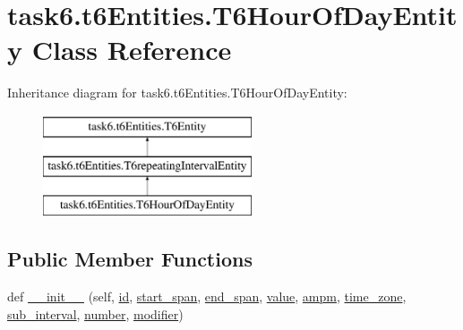 \hypertarget{classtask6_1_1t6Entities_1_1T6HourOfDayEntity}{}\section{task6.\+t6\+Entities.\+T6\+Hour\+Of\+Day\+Entity Class Reference}
\label{classtask6_1_1t6Entities_1_1T6HourOfDayEntity}
Inheritance diagram for task6.\+t6\+Entities.\+T6\+Hour\+Of\+Day\+Entity\+:\begin{figure}[H]
\begin{center}
\leavevmode
\includegraphics[height=3.000000cm]{classtask6_1_1t6Entities_1_1T6HourOfDayEntity}
\end{center}
\end{figure}
\subsection*{Public Member Functions}
\begin{DoxyCompactItemize}
\item 
def \hyperlink{classtask6_1_1t6Entities_1_1T6HourOfDayEntity_a0a375307b245c7408ae1bbaec1585dc1}{\+\_\+\+\_\+init\+\_\+\+\_\+} (self, \hyperlink{classtask6_1_1t6Entities_1_1T6Entity_afeeced8134bb3ebe0cfecc64d0ab46a4}{id}, \hyperlink{classtask6_1_1t6Entities_1_1T6Entity_a52779e9af8864dc98e8b02fc5b9b041a}{start\+\_\+span}, \hyperlink{classtask6_1_1t6Entities_1_1T6Entity_aeb402200b156cd9562c5111dfe777b98}{end\+\_\+span}, \hyperlink{classtask6_1_1t6Entities_1_1T6HourOfDayEntity_aca30067d70324692cc16ad71cc422dec}{value}, \hyperlink{classtask6_1_1t6Entities_1_1T6HourOfDayEntity_a79df4da1e3285cf9c75ca102c631bd71}{ampm}, \hyperlink{classtask6_1_1t6Entities_1_1T6HourOfDayEntity_ac288e691b6a5181108729f0f1d8c0e84}{time\+\_\+zone}, \hyperlink{classtask6_1_1t6Entities_1_1T6HourOfDayEntity_afe660c17ee2ca754246bf4b931361e4b}{sub\+\_\+interval}, \hyperlink{classtask6_1_1t6Entities_1_1T6HourOfDayEntity_a9f57727fe8828f891028e9e0f856236d}{number}, \hyperlink{classtask6_1_1t6Entities_1_1T6HourOfDayEntity_ab670222d263a06375a37059e8bb8026d}{modifier})
\end{DoxyCompactItemize}
